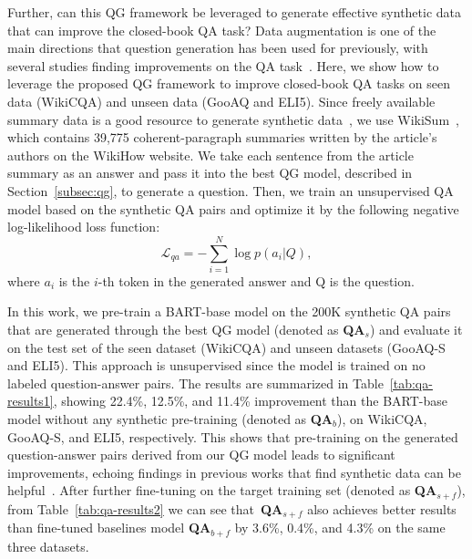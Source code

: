 \documentclass[11pt]{article}
\begin{document}
Further, can this QG framework be leveraged to generate effective synthetic data that can improve the closed-book QA task? Data augmentation is one of the main directions that question generation has been used for previously, with several studies finding improvements on the QA task~\cite{lewis-etal-2019-unsupervised,alberti-etal-2019-synthetic}. Here, we show how to leverage the proposed QG framework to improve closed-book QA tasks on seen data (WikiCQA) and unseen data (GooAQ and ELI5). Since freely available summary data is a good resource to generate synthetic data~\cite{lyu-etal-2021-improving}, we use WikiSum~\cite{cohen-etal-2021-wikisum}, which contains 39,775 coherent-paragraph summaries written by the article's authors on the WikiHow website. We take each sentence from the article summary as an answer and pass it into the best QG model, described in Section~\ref{subsec:qg}, to generate a question.
Then, we train an unsupervised QA model based on the synthetic QA pairs and optimize it by the following negative log-likelihood loss function:
\begin{equation}
    \mathcal{L}_{qa}=-\sum_{i=1}^{N}\log p(a_{i}|Q),
\end{equation}
where $a_{i}$ is the $i$-th token in the generated answer and Q is the question.

In this work, we pre-train a BART-base model on the 200K synthetic QA pairs that are generated through the best QG model (denoted as \textbf{QA}$_{s}$) and evaluate it on the test set of the seen dataset (WikiCQA) and unseen datasets (GooAQ-S and ELI5). This approach is unsupervised since the model is trained on no labeled question-answer pairs. The results are summarized in Table~\ref{tab:qa-results1}, showing 22.4\%, 12.5\%, and 11.4\% improvement than the BART-base model without any synthetic pre-training (denoted as \textbf{QA}$_{b}$), on WikiCQA, GooAQ-S, and ELI5, respectively. This shows that pre-training on the generated question-answer pairs derived from our QG model leads to significant improvements, echoing findings in previous works that find synthetic data can be helpful~\cite{khashabi-etal-2021-gooaq-open,lewis-etal-2021-paq,ding2021learning}. After further fine-tuning on the target training set (denoted as \textbf{QA}$_{s+f}$), from Table~\ref{tab:qa-results2} we can see that~\textbf{QA}$_{s+f}$ also achieves better results than fine-tuned baselines model \textbf{QA}$_{b+f}$ by 3.6\%, 0.4\%, and 4.3\% on the same three datasets.
\end{document}

